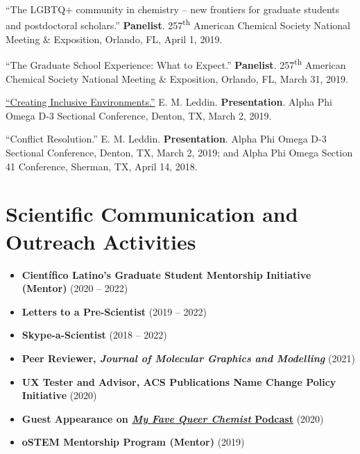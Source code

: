 \documentclass[letterpaper,11pt]{article}
\newcommand{\resumeItem}[2]{
  \item
    \textbf{#1}{ #2 \vspace{-2pt}}
}
\newcommand{\resumeSubItem}[2]{\resumeItem{#1}{#2}\vspace{-4pt}}
\newcommand{\resumeSubHeadingListStart}{\begin{itemize}[leftmargin=*]}
\newcommand{\resumeSubHeadingListEnd}{\end{itemize}}
\begin{document}
\begin{etaremune}[start=12]
  \item \textnormal{``The LGBTQ+ community in chemistry -- new frontiers for graduate students and postdoctoral scholars.'' \textbf{Panelist}. 257\textsuperscript{th} American Chemical Society National Meeting \& Exposition, Orlando, FL, April 1, 2019.}
  \item \textnormal{``The Graduate School Experience: What to Expect.'' \textbf{Panelist}. 257\textsuperscript{th} American Chemical Society National Meeting \& Exposition, Orlando, FL, March 31, 2019.}
  \item \textnormal{ \href{https://docs.google.com/presentation/d/1mKDUxe-elMQ7EkTBglIQBeZlcsdBwmfP5loLxAsshF0/edit}{``Creating Inclusive Environments.''} E. M. Leddin. \textbf{Presentation}. Alpha Phi Omega D-3 Sectional Conference, Denton, TX, March 2, 2019.}
  \item \textnormal{``Conflict Resolution.'' E. M. Leddin. \textbf{Presentation}. Alpha Phi Omega D-3 Sectional Conference, Denton, TX, March 2, 2019; and Alpha Phi Omega Section 41 Conference, Sherman, TX, April 14, 2018.}
\end{etaremune}

\section{Scientific Communication and Outreach Activities}
  \resumeSubHeadingListStart
    \resumeSubItem{Cient\'{i}fico Latino's Graduate Student Mentorship Initiative (Mentor)}
      {(2020 -- 2022)}
    \resumeSubItem{Letters to a Pre-Scientist}
      {(2019 -- 2022)}
   \resumeSubItem{Skype-a-Scientist}
      {(2018 -- 2022)}
    \resumeSubItem{Peer Reviewer, \emph{Journal of Molecular Graphics and Modelling}}
      {(2021)}
    \resumeSubItem{UX Tester and Advisor, ACS Publications Name Change Policy Initiative}
      {(2020)}
    \resumeSubItem{Guest Appearance on \href{https://www.stitcher.com/show/my-fave-queer-chemist/episode/emmett-leddin-university-of-north-texas-69219314}{\emph{My Fave Queer Chemist} Podcast}}
      {(2020)}
    \resumeSubItem{oSTEM Mentorship Program (Mentor)}
      {(2019)}
  \resumeSubHeadingListEnd

\end{document}
